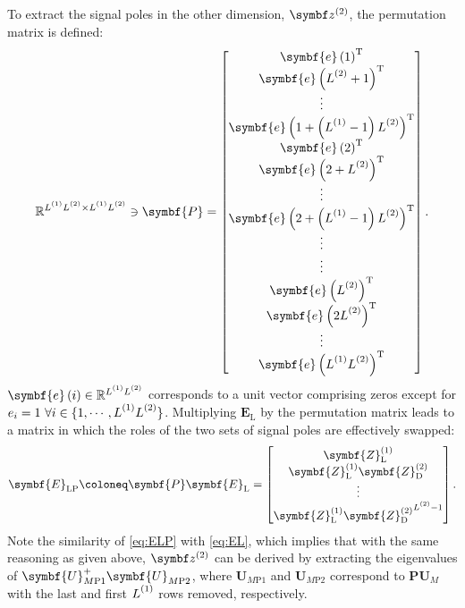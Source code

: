 To extract the signal poles in the other dimension, $\bdztwo$, the permutation
matrix is defined:
\begin{equation}
    \mathbb{R}^{\Lone \Ltwo \times \Lone \Ltwo} \ni
    \symbf{P} =
    \begin{bmatrix}
        \symbf{e}\left(1\right)\T \\
        \symbf{e}\left(\Ltwo + 1\right)\T \\
        \vdots \\
        \symbf{e}\left(1 + \left(\Lone - 1\right)\Ltwo\right)\T \\
        \symbf{e}\left(2\right)\T \\
        \symbf{e}\left(2 + \Ltwo\right)\T \\
        \vdots \\
        \symbf{e}\left(2 + \left(\Lone - 1\right)\Ltwo\right)\T \\
        \vdots \\
        \vdots \\
        \symbf{e}\left(\Ltwo\right)\T \\
        \symbf{e}\left(2\Ltwo\right)\T \\
        \vdots \\
        \symbf{e}\left(\Lone \Ltwo\right)\T \\
    \end{bmatrix}.
\end{equation}
$\symbf{e}\left(i\right) \in \mathbb{R}^{\Lone \Ltwo}$ corresponds to a unit
vector comprising zeros except for $e_i = 1\ \forall i \in \lbrace 1, \cdots,
\Lone\Ltwo \rbrace$.
Multiplying $\symbf{E}_{\text{L}}$ by the permutation matrix leads to a matrix
in which the roles of the two sets of signal poles are effectively swapped:
\begin{equation}
    \symbf{E}_{\text{LP}} \coloneq \symbf{P} \symbf{E}_{\text{L}} =
    \begin{bmatrix}
        \symbf{Z}^{(1)}_{\text{L}} \\
        \symbf{Z}^{(1)}_{\text{L}} \symbf{Z}^{(2)}_{\text{D}} \\
        \vdots \\
        \symbf{Z}^{(1)}_{\text{L}} {\symbf{Z}^{(2)}_{\text{D}}}^{\Ltwo - 1} \\
    \end{bmatrix}.\label{eq:ELP}
\end{equation}
Note the similarity of \cref{eq:ELP} with \cref{eq:EL}, which
implies that with the same reasoning as given above, $\bdztwo$ can be derived
by extracting the eigenvalues of $\symbf{U}_{M\text{P}1}^+
\symbf{U}_{M\text{P}2}^{\vphantom{+}}$, where $\symbf{U}_{M\text{P}1}$ and
$\symbf{U}_{M\text{P}2}$ correspond to $\symbf{P} \symbf{U}_M$
with the last and first $\Lone$ rows removed, respectively.

